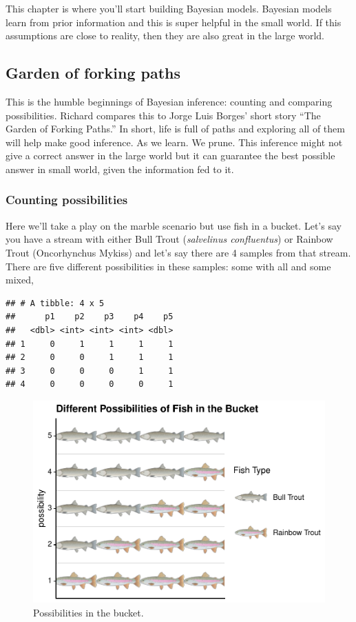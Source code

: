 \documentclass[
]{book}
\begin{document}
This chapter is where you'll start building Bayesian models. Bayesian models learn from prior information and this is super helpful in the small world. If this assumptions are close to reality, then they are also great in the large world.

\hypertarget{garden-of-forking-paths}{%
\subsection{Garden of forking paths}\label{garden-of-forking-paths}}

This is the humble beginnings of Bayesian inference: counting and comparing possibilities. Richard compares this to Jorge Luis Borges' short story ``The Garden of Forking Paths.'' In short, life is full of paths and exploring all of them will help make good inference. As we learn. We prune. This inference might not give a correct answer in the large world but it can guarantee the best possible answer in small world, given the information fed to it.

\hypertarget{counting-possibilities}{%
\subsubsection{Counting possibilities}\label{counting-possibilities}}

Here we'll take a play on the marble scenario but use fish in a bucket. Let's say you have a stream with either Bull Trout (\emph{salvelinus confluentus}) or Rainbow Trout (Oncorhynchus Mykiss) and let's say there are 4 samples from that stream. There are five different possibilities in these samples: some with all and some mixed,

\begin{verbatim}
## # A tibble: 4 x 5
##      p1    p2    p3    p4    p5
##   <dbl> <int> <int> <int> <dbl>
## 1     0     1     1     1     1
## 2     0     0     1     1     1
## 3     0     0     0     1     1
## 4     0     0     0     0     1
\end{verbatim}

\begin{figure}
\centering
\includegraphics{bookdown-demo_files/figure-latex/figure-1-1.pdf}
\caption{\label{fig:figure-1}Possibilities in the bucket.}
\end{figure}
\end{document}
